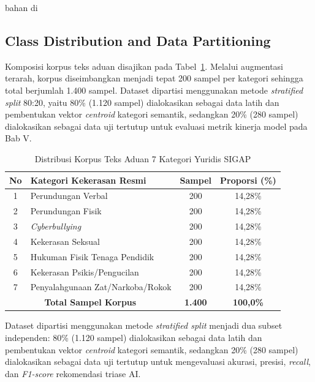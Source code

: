 bahan di\documentclass[conference]{IEEEtran}
\begin{document}
\subsection{Class Distribution and Data Partitioning}

Komposisi korpus teks aduan disajikan pada Tabel~\ref{tab:dataset}. Melalui augmentasi terarah, korpus diseimbangkan menjadi tepat 200 sampel per kategori sehingga total berjumlah 1.400 sampel. Dataset dipartisi menggunakan metode \textit{stratified split} 80:20, yaitu 80\% (1.120 sampel) dialokasikan sebagai data latih dan pembentukan vektor \textit{centroid} kategori semantik, sedangkan 20\% (280 sampel) dialokasikan sebagai data uji tertutup untuk evaluasi metrik kinerja model pada Bab V.

\begin{table}[htbp]
\caption{Distribusi Korpus Teks Aduan 7 Kategori Yuridis SIGAP}
\label{tab:dataset}
\begin{center}
\begin{tabular}{|c|p{3.4cm}|c|c|}
\hline
\textbf{No} & \textbf{Kategori Kekerasan Resmi} & \textbf{Sampel} & \textbf{Proporsi (\%)} \\
\hline
1 & Perundungan Verbal & 200 & 14,28\% \\
\hline
2 & Perundungan Fisik & 200 & 14,28\% \\
\hline
3 & \textit{Cyberbullying} & 200 & 14,28\% \\
\hline
4 & Kekerasan Seksual & 200 & 14,28\% \\
\hline
5 & Hukuman Fisik Tenaga Pendidik & 200 & 14,28\% \\
\hline
6 & Kekerasan Psikis/Pengucilan & 200 & 14,28\% \\
\hline
7 & Penyalahgunaan Zat/Narkoba/Rokok & 200 & 14,28\% \\
\hline
\multicolumn{2}{|c|}{\textbf{Total Sampel Korpus}} & \textbf{1.400} & \textbf{100,0\%} \\
\hline
\end{tabular}
\end{center}
\end{table}

Dataset dipartisi menggunakan metode \textit{stratified split} menjadi dua subset independen: 80\% (1.120 sampel) dialokasikan sebagai data latih dan pembentukan vektor \textit{centroid} kategori semantik, sedangkan 20\% (280 sampel) dialokasikan sebagai data uji tertutup untuk mengevaluasi akurasi, presisi, \textit{recall}, dan \textit{F1-score} rekomendasi triase AI.
\end{document}
